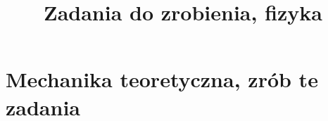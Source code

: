 \documentclass[a4paper,11pt]{article}
\title{Zadania do zrobienia, fizyka}
\begin{document}





\maketitle  %





\section{Mechanika teoretyczna, zrób te zadania}


\end{document}
